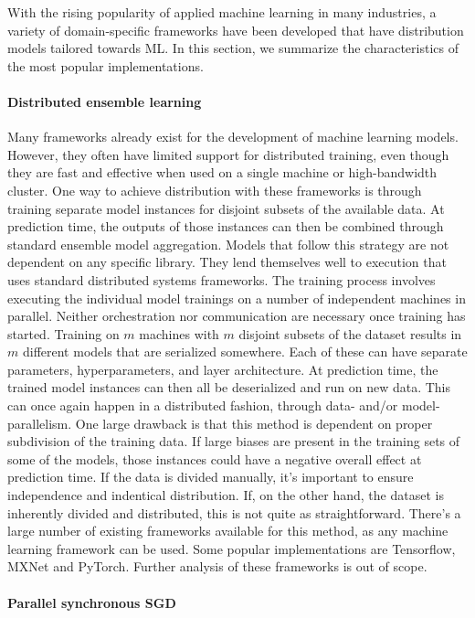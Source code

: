 With the rising popularity of applied machine learning in many industries, a variety of domain-specific frameworks have been developed that have distribution models tailored towards ML. In this section, we summarize the characteristics of the most popular implementations.

\paragraph{Distributed ensemble learning}
Many frameworks already exist for the development of machine learning models. However, they often have limited support for distributed training, even though they are fast and effective when used on a single machine or high-bandwidth cluster. One way to achieve distribution with these frameworks is through training separate model instances for disjoint subsets of the available data. At prediction time, the outputs of those instances can then be combined through standard ensemble model aggregation\citep{Opitz1999}.
Models that follow this strategy are not dependent on any specific library. They lend themselves well to execution that uses standard distributed systems frameworks. The training process involves executing the individual model trainings on a number of independent machines in parallel. Neither orchestration nor communication are necessary once training has started. Training on $m$ machines with $m$ disjoint subsets of the dataset results in $m$ different models that are serialized somewhere. Each of these can have separate parameters, hyperparameters, and layer architecture. At prediction time, the trained model instances can then all be deserialized and run on new data. This can once again happen in a distributed fashion, through data- and/or model-parallelism.
One large drawback is that this method is dependent on proper subdivision of the training data. If large biases are present in the training sets of some of the models, those instances could have a negative overall effect at prediction time. If the data is divided manually, it's important to ensure independence and indentical distribution. If, on the other hand, the dataset is inherently divided and distributed, this is not quite as straightforward.
There's a large number of existing frameworks available for this method, as any machine learning framework can be used. Some popular implementations are Tensorflow\citep{Tensorflow2015}, MXNet\citep{MXNet2015} and PyTorch\citep{PyTorch2017}. Further analysis of these frameworks is out of scope.

\paragraph{Parallel synchronous SGD}


